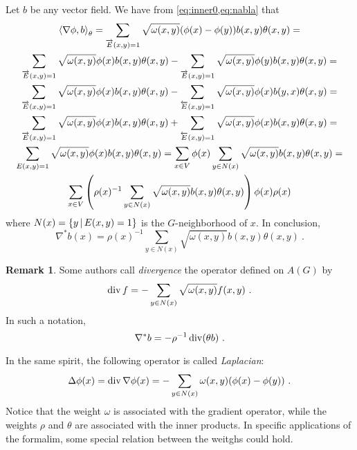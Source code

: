 \documentclass[12pt,a4paper]{amsart}
\theoremstyle{definition}
\newtheorem{remark}{Remark}
\begin{document}
Let $b$ be any vector field. We have from \cref{eq:inner0,eq:nabla} that
\begin{multline*}
  \left\langle\nabla \phi,b\right\rangle_{\theta} = \sum_{\overrightarrow E(x,y)=1}
  \sqrt{\omega(x,y)}  (\phi(x) - \phi(y)) b(x,y) \theta(x,y) = \\
  \sum_{\overrightarrow E(x,y)=1} \sqrt{\omega(x,y)} \phi(x) b(x,y)
  \theta(x,y) - \sum_{\overrightarrow E(x,y)=1}
  \sqrt{\omega(x,y)}  \phi(y) b(x,y) \theta(x,y) = \\
  \sum_{\overrightarrow E(x,y)=1} \sqrt{\omega(x,y)} \phi(x) b(x,y)
  \theta(x,y) - \sum_{\overleftarrow E(x,y)=1}
  \sqrt{\omega(x,y)}  \phi(x) b(y,x) \theta(x,y) = \\
  \sum_{\overrightarrow E(x,y)=1} \sqrt{\omega(x,y)} \phi(x) b(x,y)
  \theta(x,y) + \sum_{\overleftarrow E(x,y)=1}
  \sqrt{\omega(x,y)}  \phi(x) b(x,y) \theta(x,y) = \\
  \sum_{E(x,y)=1} \sqrt{\omega(x,y)}  \phi(x) b(x,y) \theta(x,y) = 
  \sum_{x \in V} \phi(x) \sum_{y \in N(x)}
  \sqrt{\omega(x,y)}  b(x,y) \theta(x,y) = \\
  \sum_{x \in V} \left(\rho(x)^{-1} \sum_{y \in N(x)}
  \sqrt{\omega(x,y)}  b(x,y) \theta(x,y) \right) \phi(x) \rho(x)
\end{multline*}
where $N(x) = \left\{y \, \middle| \, E(x,y)=1 \right\}$ is the $G$-neighborhood of $x$. In
conclusion,
\begin{equation*}
  \nabla^* b(x) = \rho(x)^{-1} \sum_{y \in N(x)}
  \sqrt{\omega(x,y)}  b(x,y) \theta(x,y) \ .
\end{equation*}

\begin{remark}
  Some authors call \emph{divergence} the operator defined on $A(G)$ by
\begin{equation*}
  \operatorname*{div} f = - \sum_{y \in N(x)} \sqrt{\omega(x,y)} f(x,y) \ .
\end{equation*}
In such a notation,
\begin{equation*}
  \nabla^* b = - \rho^{-1} \Div(\theta b) \ . 
\end{equation*}

In the same spirit, the following operator is called \emph{Laplacian}:
\begin{equation*}
  \Delta \phi (x) = \operatorname*{div} \nabla \phi (x)= - \sum_{y \in N(x)}
  \omega(x,y) (\phi(x)-\phi(y)) \ .
\end{equation*}
Notice that the weight $\omega$ is associated with the gradient
operator, while the weights $\rho$ and $\theta$ are associated with
the inner products. In specific applications of the formalim, some
special relation between the weitghs could hold.
\end{remark}
\end{document}
